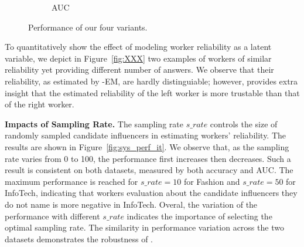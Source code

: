 \begin{figure}[htb]
\begin{subfigure}[t]{0.47\columnwidth}
    \vspace{-0.15in}
        \caption{AUC\label{fig:AUC}} 
    \end{subfigure}%
   \caption{Performance of our four variants.} \label{fig:variants}
\end{figure}

To quantitatively show the effect of modeling worker reliability as a latent variable, we depict in Figure~\ref{fig:XXX}  two examples of workers of similar reliability yet providing different number of answers. We observe that their reliability, as estimated by \sys-EM, are hardly distinguiable; however, \sys provides extra insight that the estimated reliability of the left worker is more trustable than that of the right worker.



\smallskip
\noindent\textbf{Impacts of Sampling Rate.}
The sampling rate $s\_rate$ controls the size of randomly sampled candidate influencers in estimating workers' reliability. The results are shown in Figure~\ref{fig:sys_perf_it}. We observe that, as the sampling rate varies from 0 to 100, the performance first increases then decreases. Such a result is consistent on both datasets, measured by both accuracy and AUC. The maximum performance is reached for $s\_rate= 10$ for Fashion and $s\_rate= 50$ for InfoTech, indicating that workers evaluation about the candidate influencers they do not name is more negative in InfoTech. Overal, the variation of the performance with different $s\_rate$ indicates the importance of selecting the optimal sampling rate. The similarity in performance variation across the two datasets demonstrates the robustness of \sys.


